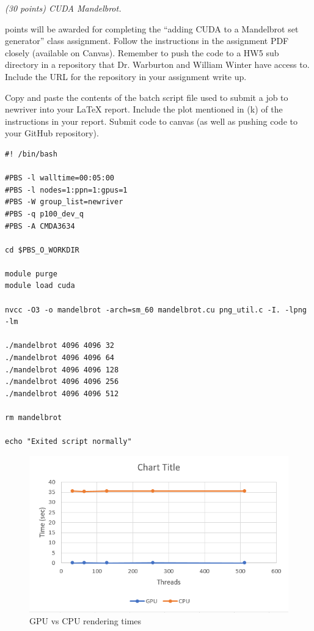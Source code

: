 \documentclass{article}
\newcommand{\pad}{\vspace{8pt}\noindent}
\begin{document}
\newpage




\pad {\bf Q1} {\it (30 points) CUDA Mandelbrot.}
\vspace{8pt} 

 points will be awarded for completing the ``adding CUDA to a Mandelbrot set generator'' class assignment. Follow the instructions in the assignment PDF closely (available on Canvas). Remember to push the code to a HW5 sub directory in a repository that Dr. Warburton and William Winter have access to. Include the URL for the repository in your assignment write up.

\vspace{1em}


\noindent Copy and paste the contents of the batch script file used to submit a job to newriver into your \LaTeX{} report. Include the plot mentioned in (k) of the instructions in your report. Submit code to canvas (as well as pushing code to your GitHub repository).

\begin{verbatim}
#! /bin/bash

#PBS -l walltime=00:05:00
#PBS -l nodes=1:ppn=1:gpus=1
#PBS -W group_list=newriver
#PBS -q p100_dev_q
#PBS -A CMDA3634

cd $PBS_O_WORKDIR

module purge
module load cuda

nvcc -O3 -o mandelbrot -arch=sm_60 mandelbrot.cu png_util.c -I. -lpng -lm

./mandelbrot 4096 4096 32
./mandelbrot 4096 4096 64
./mandelbrot 4096 4096 128
./mandelbrot 4096 4096 256
./mandelbrot 4096 4096 512

rm mandelbrot

echo "Exited script normally"
\end{verbatim}

\begin{figure}[h!]
    \centering
    \includegraphics[scale=1]{gpu_cpu_mandelbrot.png}
    \caption{GPU vs CPU rendering times}
    \label{fig:gpu_cpu}
\end{figure}
\end{document}
